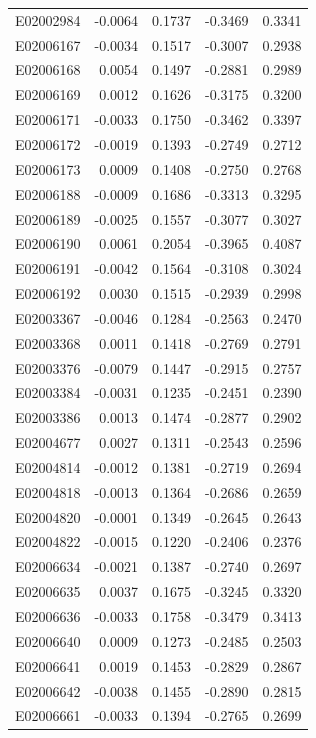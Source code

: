 \documentclass[11pt, a4paper]{article}
\begin{document}
\begin{longtable}{lrrrr}
E02002984 & -0.0064 & 0.1737 & -0.3469 & 0.3341 \\
E02006167 & -0.0034 & 0.1517 & -0.3007 & 0.2938 \\
E02006168 & 0.0054 & 0.1497 & -0.2881 & 0.2989 \\
E02006169 & 0.0012 & 0.1626 & -0.3175 & 0.3200 \\
E02006171 & -0.0033 & 0.1750 & -0.3462 & 0.3397 \\
E02006172 & -0.0019 & 0.1393 & -0.2749 & 0.2712 \\
E02006173 & 0.0009 & 0.1408 & -0.2750 & 0.2768 \\
E02006188 & -0.0009 & 0.1686 & -0.3313 & 0.3295 \\
E02006189 & -0.0025 & 0.1557 & -0.3077 & 0.3027 \\
E02006190 & 0.0061 & 0.2054 & -0.3965 & 0.4087 \\
E02006191 & -0.0042 & 0.1564 & -0.3108 & 0.3024 \\
E02006192 & 0.0030 & 0.1515 & -0.2939 & 0.2998 \\
E02003367 & -0.0046 & 0.1284 & -0.2563 & 0.2470 \\
E02003368 & 0.0011 & 0.1418 & -0.2769 & 0.2791 \\
E02003376 & -0.0079 & 0.1447 & -0.2915 & 0.2757 \\
E02003384 & -0.0031 & 0.1235 & -0.2451 & 0.2390 \\
E02003386 & 0.0013 & 0.1474 & -0.2877 & 0.2902 \\
E02004677 & 0.0027 & 0.1311 & -0.2543 & 0.2596 \\
E02004814 & -0.0012 & 0.1381 & -0.2719 & 0.2694 \\
E02004818 & -0.0013 & 0.1364 & -0.2686 & 0.2659 \\
E02004820 & -0.0001 & 0.1349 & -0.2645 & 0.2643 \\
E02004822 & -0.0015 & 0.1220 & -0.2406 & 0.2376 \\
E02006634 & -0.0021 & 0.1387 & -0.2740 & 0.2697 \\
E02006635 & 0.0037 & 0.1675 & -0.3245 & 0.3320 \\
E02006636 & -0.0033 & 0.1758 & -0.3479 & 0.3413 \\
E02006640 & 0.0009 & 0.1273 & -0.2485 & 0.2503 \\
E02006641 & 0.0019 & 0.1453 & -0.2829 & 0.2867 \\
E02006642 & -0.0038 & 0.1455 & -0.2890 & 0.2815 \\
E02006661 & -0.0033 & 0.1394 & -0.2765 & 0.2699 \\

\end{longtable}
\end{document}
